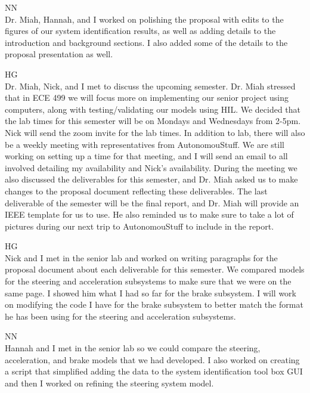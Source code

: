 \documentclass[fontsize=11pt, %
                             paper=letter, %
                             openany, %
                             captions=tableheading,
                             index=totoc,
                             hyperref]{labbook}
\def\currentYear{2021}
\begin{document}
\begin{addmargin}[0cm]{0cm}
NN\\ 
Dr. Miah, Hannah, and I worked on polishing the proposal with edits to the figures of our system identification results, as well as adding details to the introduction and background sections. I also added some of the details to the proposal presentation as well.


\def\currentYear{2022}

\labday{Monday, January 24, \currentYear}
HG\\
Dr. Miah, Nick, and I met to discuss the upcoming semester. Dr. Miah stressed that in ECE 499 we will focus more on implementing our senior project using computers, along with testing/validating our models using HIL. We decided that the lab times for this semester will be on Mondays and Wednesdays from 2-5pm. Nick will send the zoom invite for the lab times. In addition to lab, there will also be a weekly meeting with representatives from AutonomouStuff. We are still working on setting up a time for that meeting, and I will send an email to all involved detailing my availability and Nick's availability. During the meeting we also discussed the deliverables for this semester, and Dr. Miah asked us to make changes to the proposal document reflecting these deliverables. The last deliverable of the semester will be the final report, and Dr. Miah will provide an IEEE template for us to use. He also reminded us to make sure to take a lot of pictures during our next trip to AutonomouStuff to include in the report. 

\labday{Wednesday, January 26, \currentYear}
HG\\
Nick and I met in the senior lab and worked on writing paragraphs for the proposal document about each deliverable for this semester. We compared models for the steering and acceleration subsystems to make sure that we were on the same page. I showed him what I had so far for the brake subsystem. I will work on modifying the code I have for the brake subsystem to better match the format he has been using for the steering and acceleration subsystems.  

NN\\ 
Hannah and I met in the senior lab so we could compare the steering, acceleration, and brake models that we had developed. I also worked on creating a script that simplified adding the data to the system identification tool box GUI and then I worked on refining the steering system model.



\end{addmargin}
\end{document}
